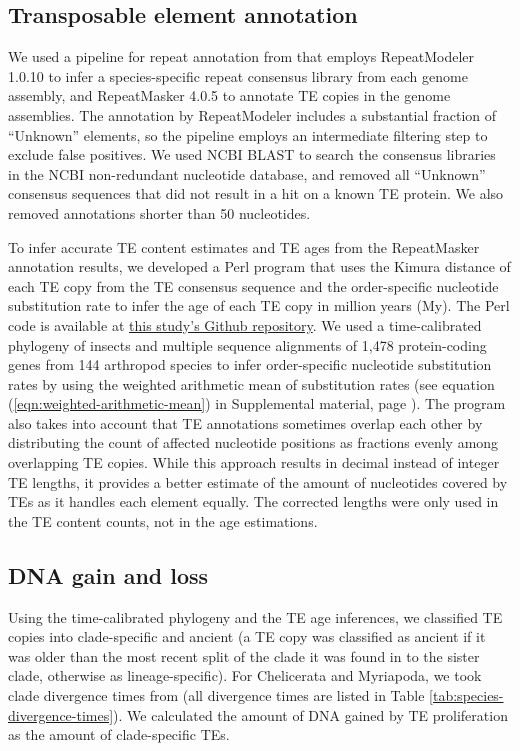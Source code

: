 \subsection*{Transposable element
annotation}

We used a pipeline for repeat annotation from \citet{Petersen2019} that
employs RepeatModeler 1.0.10 \citep{Smit2015a} to infer a
species-specific repeat consensus library from each genome assembly, and
RepeatMasker 4.0.5 \citep{Smit2015} to annotate TE copies in the
genome assemblies. The annotation by RepeatModeler includes a
substantial fraction of ``Unknown'' elements, so the pipeline employs an
intermediate filtering step to exclude false positives. We used NCBI
BLAST to search the consensus libraries in the NCBI non-redundant
nucleotide database, and removed all ``Unknown'' consensus sequences
that did not result in a hit on a known TE protein. We also removed
annotations shorter than 50 nucleotides.

To infer accurate TE content estimates and TE ages from the RepeatMasker
annotation results, we developed a Perl program that uses the Kimura
distance of each TE copy from the TE consensus sequence and the
order-specific nucleotide substitution rate to infer the age of each TE
copy in million years (My). The Perl code is available at
\href{https://github.com/mptrsen/dynamics-of-genome-size}{this study's
Github repository}. We used a time-calibrated phylogeny of insects
\citep{Misof2014} and multiple sequence alignments of 1,478
protein-coding genes from 144 arthropod species \citep{Misof2014} to
infer order-specific nucleotide substitution rates by using the weighted
arithmetic mean of substitution rates (see equation
(\ref{eqn:weighted-arithmetic-mean}) in Supplemental
material, page \pageref{eqn:weighted-arithmetic-mean}). The program also takes into account that TE annotations
sometimes overlap each other by distributing the count of affected
nucleotide positions as fractions evenly among overlapping TE copies.
While this approach results in decimal instead of integer TE lengths, it
provides a better estimate of the amount of nucleotides covered by TEs
as it handles each element equally. The corrected lengths were only used
in the TE content counts, not in the age estimations.

\subsection*{DNA gain and loss}

Using the time-calibrated phylogeny and the TE age inferences, we
classified TE copies into clade-specific and ancient (a TE copy was
classified as ancient if it was older than the most recent split of the
clade it was found in to the sister clade, otherwise as
lineage-specific). For Chelicerata and Myriapoda, we took clade
divergence times from \citet{Misof2014} (all divergence times are
listed in Table \ref{tab:species-divergence-times}). We calculated the amount of DNA gained by TE
proliferation as the amount of clade-specific TEs.

